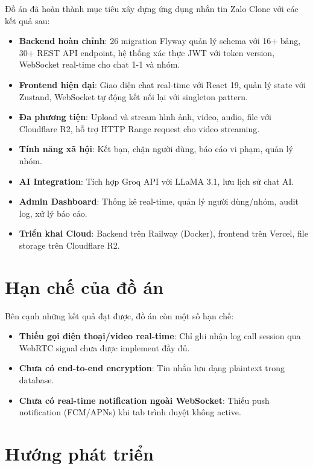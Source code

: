 \documentclass[12pt,a4paper]{report}
\begin{document}
Đồ án đã hoàn thành mục tiêu xây dựng ứng dụng nhắn tin Zalo Clone với các kết quả sau:

\begin{itemize}
    \item \textbf{Backend hoàn chỉnh}: 26 migration Flyway quản lý schema với 16+ bảng, 30+ REST API endpoint, hệ thống xác thực JWT với token version, WebSocket real-time cho chat 1-1 và nhóm.
    \item \textbf{Frontend hiện đại}: Giao diện chat real-time với React 19, quản lý state với Zustand, WebSocket tự động kết nối lại với singleton pattern.
    \item \textbf{Đa phương tiện}: Upload và stream hình ảnh, video, audio, file với Cloudflare R2, hỗ trợ HTTP Range request cho video streaming.
    \item \textbf{Tính năng xã hội}: Kết bạn, chặn người dùng, báo cáo vi phạm, quản lý nhóm.
    \item \textbf{AI Integration}: Tích hợp Groq API với LLaMA 3.1, lưu lịch sử chat AI.
    \item \textbf{Admin Dashboard}: Thống kê real-time, quản lý người dùng/nhóm, audit log, xử lý báo cáo.
    \item \textbf{Triển khai Cloud}: Backend trên Railway (Docker), frontend trên Vercel, file storage trên Cloudflare R2.
\end{itemize}

\section{Hạn chế của đồ án}

Bên cạnh những kết quả đạt được, đồ án còn một số hạn chế:

\begin{itemize}
    \item \textbf{Thiếu gọi điện thoại/video real-time}: Chỉ ghi nhận log call session qua WebRTC signal chưa được implement đầy đủ.
    \item \textbf{Chưa có end-to-end encryption}: Tin nhắn lưu dạng plaintext trong database.
    \item \textbf{Chưa có real-time notification ngoài WebSocket}: Thiếu push notification (FCM/APNs) khi tab trình duyệt không active.
\end{itemize}

\section{Hướng phát triển}
\end{document}
